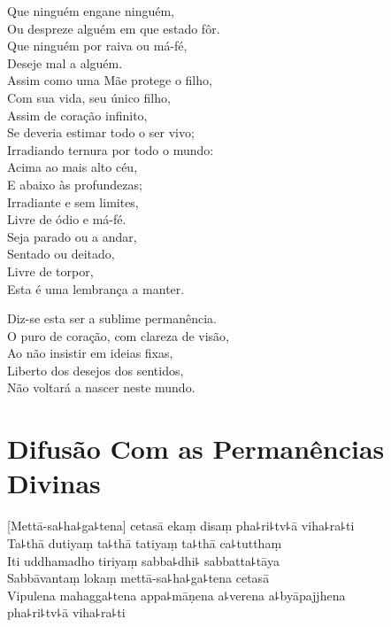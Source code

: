 Que ninguém engane ninguém,\\
Ou despreze alguém em que estado fôr.\\
Que ninguém por raiva ou má-fé,\\
Deseje mal a alguém.\\
Assim como uma Mãe protege o filho,\\
Com sua vida, seu único filho,\\
Assim de coração infinito,\\
Se deveria estimar todo o ser vivo;\\
Irradiando ternura por todo o mundo:\\
Acima ao mais alto céu,\\
E abaixo às profundezas;\\
Irradiante e sem limites,\\
Livre de ódio e má-fé.\\
Seja parado ou a andar,\\
Sentado ou deitado,\\
Livre de torpor,\\
Esta é uma lembrança a manter.

Diz-se esta ser a sublime permanência.\\
O puro de coração, com clareza de visão,\\
Ao não insistir em ideias fixas,\\
Liberto dos desejos dos sentidos,\\
Não voltará a nascer neste mundo.

\chapter*[Permanências Divinas]{Difusão Com as Permanências Divinas}

\delegateSetUseNext


\begin{leader}
\end{leader}

[Mettā-sa꜕ha꜕ga꜕tena] cetasā ekaṃ disaṃ pha꜕ri꜕tv꜕ā viha꜕ra꜕ti\\
Ta꜕thā dutiyaṃ ta꜕thā tatiyaṃ ta꜕thā ca꜕tutthaṃ\\
Iti uddhamadho tiriyaṃ sabba꜕dhi꜕ sabbatta꜕tāya\\
Sabbāvantaṃ lokaṃ mettā-sa꜕ha꜕ga꜕tena cetasā\\
Vipulena mahagga꜕tena appa꜕māṇena a꜕verena a꜕byāpajjhena\\
\vin pha꜕ri꜕tv꜕ā viha꜕ra꜕ti

